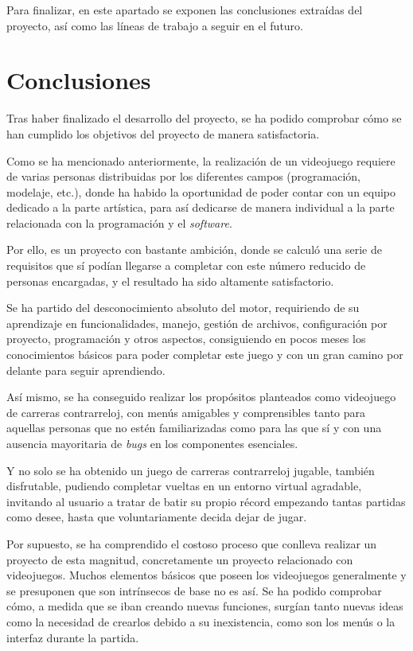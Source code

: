
Para finalizar, en este apartado se exponen las conclusiones extraídas del proyecto, así como las líneas de trabajo a seguir en el futuro.

\section{Conclusiones}

Tras haber finalizado el desarrollo del proyecto, se ha podido comprobar cómo se han cumplido los objetivos del proyecto de manera satisfactoria. 

Como se ha mencionado anteriormente, la realización de un videojuego requiere de varias personas distribuidas por los diferentes campos (programación, modelaje, etc.), donde ha habido la oportunidad de poder contar con un equipo dedicado a la parte artística, para así dedicarse de manera individual a la parte relacionada con la programación y el \textit{software}. 

Por ello, es un proyecto con bastante ambición, donde se calculó una serie de requisitos que sí podían llegarse a completar con este número reducido de personas encargadas, y el resultado ha sido altamente satisfactorio.

Se ha partido del desconocimiento absoluto del motor, requiriendo de su aprendizaje en funcionalidades, manejo, gestión de archivos, configuración por proyecto, programación y otros aspectos, consiguiendo en pocos meses los conocimientos básicos para poder completar este juego y con un gran camino por delante para seguir aprendiendo.

Así mismo, se ha conseguido realizar los propósitos planteados como videojuego de carreras contrarreloj, con menús amigables y comprensibles tanto para aquellas personas que no estén familiarizadas como para las que sí y con una ausencia mayoritaria de \textit{bugs} en los componentes esenciales.

Y no solo se ha obtenido un juego de carreras contrarreloj jugable, también disfrutable, pudiendo completar vueltas en un entorno virtual agradable, invitando al usuario a tratar de batir su propio récord empezando tantas partidas como desee, hasta que voluntariamente decida dejar de jugar.

Por supuesto, se ha comprendido el costoso proceso que conlleva realizar un proyecto de esta magnitud, concretamente un proyecto relacionado con videojuegos. Muchos elementos básicos que poseen los videojuegos generalmente y se presuponen que son intrínsecos de base no es así. Se ha podido comprobar cómo, a medida que se iban creando nuevas funciones, surgían tanto nuevas ideas como la necesidad de crearlos debido a su inexistencia, como son los menús o la interfaz durante la partida. 

